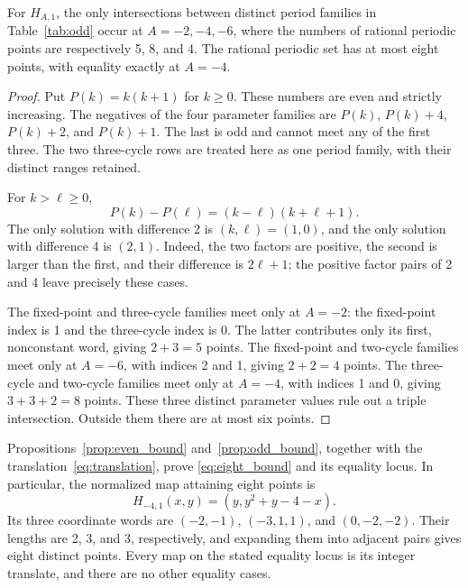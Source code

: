 \begin{proposition}
\label{prop:odd_bound}
For \(H_{A,1}\), the only intersections between distinct period
families in Table~\ref{tab:odd} occur at
\(A=-2,-4,-6\), where the numbers of rational periodic points are
respectively 5, 8, and 4. The rational periodic set has at most eight
points, with equality exactly at \(A=-4\).
\end{proposition}
\begin{proof}
Put \(P(k)=k(k+1)\) for \(k\ge0\). These numbers are even and strictly
increasing. The negatives of the four parameter families are
\(P(k)\), \(P(k)+4\), \(P(k)+2\), and \(P(k)+1\).
The last is odd and cannot meet any of the first three. The two
three-cycle rows are treated here as one period family, with their
distinct ranges retained.

For \(k>\ell\ge0\),
\begin{equation}
 P(k)-P(\ell)=(k-\ell)(k+\ell+1).
 \label{eq:pronic_difference}
\end{equation}
The only solution with difference 2 is \((k,\ell)=(1,0)\), and the
only solution with difference 4 is \((2,1)\). Indeed, the two factors
are positive, the second is larger than the first, and their difference
is \(2\ell+1\); the positive factor pairs of 2 and 4 leave precisely
these cases.

The fixed-point and three-cycle families meet only at \(A=-2\): the
fixed-point index is 1 and the three-cycle index is 0. The latter
contributes only its first, nonconstant word, giving \(2+3=5\) points.
The fixed-point and two-cycle families meet only at \(A=-6\), with
indices 2 and 1, giving \(2+2=4\) points. The three-cycle and two-cycle
families meet only at \(A=-4\), with indices 1 and 0, giving
\(3+3+2=8\) points. These three distinct parameter values rule out a
triple intersection. Outside them there are at most six points.
\end{proof}

Propositions~\ref{prop:even_bound} and~\ref{prop:odd_bound}, together
with the translation~\eqref{eq:translation}, prove
\eqref{eq:eight_bound} and its equality locus. In particular, the
normalized map attaining eight points is
\[
 H_{-4,1}(x,y)=(y,y^2+y-4-x).
\]
Its three coordinate words are \((-2,-1)\), \((-3,1,1)\), and
\((0,-2,-2)\). Their lengths are 2, 3, and 3, respectively, and
expanding them into adjacent pairs gives eight distinct points. Every
map on the stated equality locus is its integer translate, and there
are no other equality cases.
